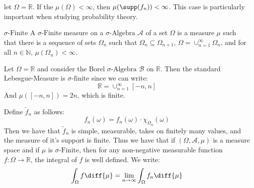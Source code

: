         let $\Omega=\mathbb{R}$. If the $\mu(\Omega)<\infty$,
        then $\mu(\supp(f_{n}))<\infty$. This case is particularly
        important when studying probability theory.
        \begin{ldefinition}{$\sigma\textrm{-Finite}$}
            A $\sigma\textrm{-Finite}$ measure on a
            $\sigma\textrm{-Algebra}$ $\mathcal{A}$ of a set
            $\Omega$ is a measure $\mu$ such that there is a
            sequence of sets $\Omega_{n}$ such that
            $\Omega_{n}\subseteq\Omega_{n+1}$,
            $\Omega=\cup_{n=1}^{\infty}\Omega_{n}$, and for all
            $n\in\mathbb{N}$, $\mu(\Omega_{n})<\infty$.
        \end{ldefinition}
        \begin{lexample}
            Let $\Omega=\mathbb{R}$ and consider the Borel
            $\sigma\textrm{-Algebra}$ $\mathcal{B}$ on
            $\mathbb{R}$. Then the standard Lebesgue-Measure
            is $\sigma\textrm{-finite}$ since we can write:
            \begin{equation}
                \mathbb{R}=\cup_{n=1}^{\infty}[-n,n]
            \end{equation}
            And $\mu([-n,n])=2n$, which is finite.
        \end{lexample}
        Define $\tilde{f}_{n}$ as follows:
        \begin{equation}
            f_{n}(\omega)
            =f_{n}(\omega)\cdot\chi_{\Omega_{n}}(\omega)
        \end{equation}
        Then we have that $\tilde{f}_{n}$ is simple, measurable,
        takes on finitely many values, and the measure of it's
        support is finite. Thus we have that if
        $(\Omega,\mathcal{A},\mu)$ is a measure space and if
        $\mu$ is $\sigma\textrm{-Finite}$, then for any
        non-negative measurable function
        $f:\Omega\rightarrow\mathbb{R}$, the integral of $f$ is
        well defined. We write:
        \begin{equation}
            \int_{\Omega}f\diff{\mu}=
            \underset{n\rightarrow\infty}{\lim}
            \int_{\Omega}f_{n}\diff{\mu}
        \end{equation}
